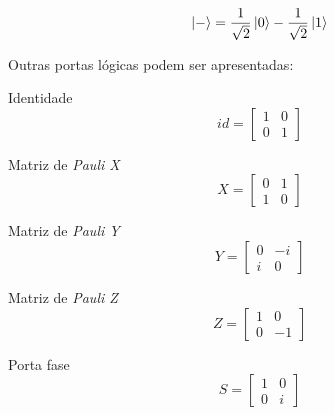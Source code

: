     $$
        \ket{-}=\dfrac{1}{\sqrt{2}}\ket{0}-\dfrac{1}{\sqrt{2}}\ket{1}
    $$
    
    Outras portas lógicas podem ser apresentadas:
    \begin{enumerate}
    \begin{minipage}{0.5\textwidth}
        \item Identidade
        $$
            id=\left[\begin{array}{cc}
                 1 & 0 \\
                 0 & 1
            \end{array}\right]
        $$
    \end{minipage}
    \begin{minipage}{0.5\textwidth}
        \item Matriz de \textit{Pauli X}
        $$
            X=\left[\begin{array}{cc}
                 0 & 1 \\
                 1 & 0
            \end{array}\right]
        $$
    \end{minipage}
    \begin{minipage}{0.5\textwidth}
        \item Matriz de \textit{Pauli Y}
        $$
            Y=\left[\begin{array}{cc}
                 0 & -i \\
                 i & 0
            \end{array}\right]
        $$
    \end{minipage}
    \begin{minipage}{0.5\textwidth}
        \item Matriz de \textit{Pauli Z}
        $$
            Z=\left[\begin{array}{cc}
                 1 & 0 \\
                 0 & -1
            \end{array}\right]
        $$
    \end{minipage}
    \begin{minipage}{0.5\textwidth}
        \item Porta fase
        $$
            S=\left[\begin{array}{cc}
                 1 & 0 \\
                 0 & i
            \end{array}\right]
        $$
    \end{minipage}
    \begin{minipage}{0.5\textwidth}

\end{minipage}
\end{enumerate}
